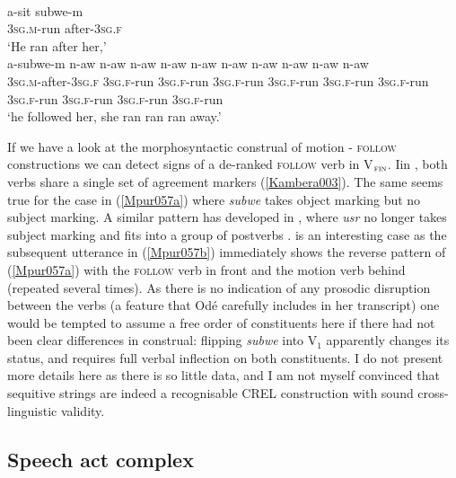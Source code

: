 \ea 
{}\\
\ea \label{Mpur057a}
\gll a-sit subwe-m \\
\textsc{3}\textsc{sg}.\textsc{m}-run after-\textsc{3}\textsc{sg}.\textsc{f} \\
\glft `He ran after her,' \\ 
\ex \label{Mpur057b}
\gll a-subwe-m n-aw n-aw n-aw n-aw n-aw n-aw n-aw n-aw n-aw n-aw \\
\textsc{3}\textsc{sg}.\textsc{m}-after-\textsc{3}\textsc{sg}.\textsc{f} \textsc{3}\textsc{sg}.\textsc{f}-run \textsc{3}\textsc{sg}.\textsc{f}-run \textsc{3}\textsc{sg}.\textsc{f}-run \textsc{3}\textsc{sg}.\textsc{f}-run \textsc{3}\textsc{sg}.\textsc{f}-run \textsc{3}\textsc{sg}.\textsc{f}-run \textsc{3}\textsc{sg}.\textsc{f}-run \textsc{3}\textsc{sg}.\textsc{f}-run \textsc{3}\textsc{sg}.\textsc{f}-run \textsc{3}\textsc{sg}.\textsc{f}-run\\
\glft `he followed her, she ran ran ran away.'\\ 
\z
\z

If we have a look at the morphosyntactic construal of motion - \textsc{follow} constructions we can detect signs of a de-ranked \textsc{follow} verb in V$_{\textsc{fin}}$. Iin , both verbs share a single set of agreement markers (\ref{Kambera003}). The same seems true for the  case in (\ref{Mpur057a}) where \textit{subwe} takes object marking but no subject marking. A similar pattern has developed in , where \textit{usr} no longer takes subject marking and fits into a group of postverbs \citep[183, and pp. 187--91]{vanheuvel2006}.  is an interesting case as the subsequent utterance in (\ref{Mpur057b}) immediately shows the reverse pattern of (\ref{Mpur057a}) with the \textsc{follow} verb in front and the motion verb behind (repeated several times). As there is no indication of any prosodic disruption between the verbs (a feature that Odé carefully includes in her transcript) one would be tempted to assume a free order of constituents here if there had not been clear differences in construal: flipping \textit{subwe} into V$_{1}$ apparently changes its status, and requires full verbal inflection on both constituents. I do not present more details here as there is so little data, and I am not myself convinced that sequitive strings are indeed a recognisable CREL construction with sound cross-linguistic validity.

\subsection{Speech act complex} \label{sec:speechactcomplex}

